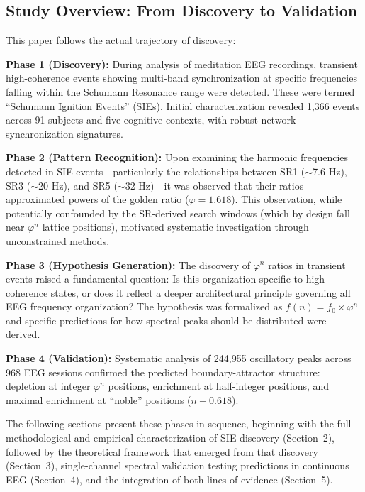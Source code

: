 \documentclass[11pt,a4paper]{article}
\newcommand{\phisym}{\varphi}
\begin{document}
\subsection{Study Overview: From Discovery to Validation}

This paper follows the actual trajectory of discovery:

\textbf{Phase 1 (Discovery):} During analysis of meditation EEG recordings, transient high-coherence events showing multi-band synchronization at specific frequencies falling within the Schumann Resonance range were detected. These were termed ``Schumann Ignition Events'' (SIEs). Initial characterization revealed 1,366 events across 91 subjects and five cognitive contexts, with robust network synchronization signatures.

\textbf{Phase 2 (Pattern Recognition):} Upon examining the harmonic frequencies detected in SIE events---particularly the relationships between SR1 ($\sim$7.6 Hz), SR3 ($\sim$20 Hz), and SR5 ($\sim$32 Hz)---it was observed that their ratios approximated powers of the golden ratio ($\phisym = 1.618$). This observation, while potentially confounded by the SR-derived search windows (which by design fall near $\phisym^n$ lattice positions), motivated systematic investigation through unconstrained methods.

\textbf{Phase 3 (Hypothesis Generation):} The discovery of $\phisym^n$ ratios in transient events raised a fundamental question: Is this organization specific to high-coherence states, or does it reflect a deeper architectural principle governing all EEG frequency organization? The hypothesis was formalized as $f(n) = f_0 \times \phisym^n$ and specific predictions for how spectral peaks should be distributed were derived.

\textbf{Phase 4 (Validation):} Systematic analysis of 244,955 oscillatory peaks across 968 EEG sessions confirmed the predicted boundary-attractor structure: depletion at integer $\phisym^n$ positions, enrichment at half-integer positions, and maximal enrichment at ``noble'' positions ($n + 0.618$).

The following sections present these phases in sequence, beginning with the full methodological and empirical characterization of SIE discovery (Section~2), followed by the theoretical framework that emerged from that discovery (Section~3), single-channel spectral validation testing predictions in continuous EEG (Section~4), and the integration of both lines of evidence (Section~5).
\end{document}
